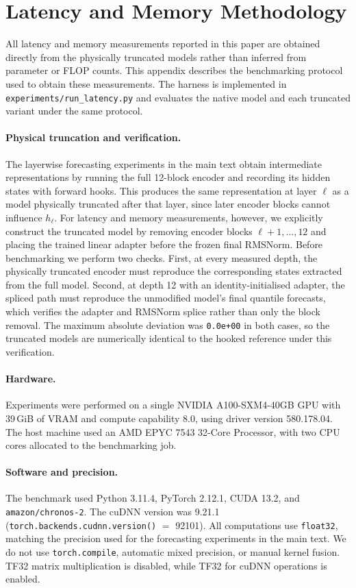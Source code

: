 \section{Latency and Memory Methodology}
\label{app:latency-methodology}

All latency and memory measurements reported in this paper are obtained directly from the physically truncated models rather than inferred from parameter or FLOP counts. This appendix describes the benchmarking protocol used to obtain these measurements. The harness is implemented in \texttt{experiments/run\_latency.py} and evaluates the native model and each truncated variant under the same protocol.

\paragraph{Physical truncation and verification.}
The layerwise forecasting experiments in the main text obtain intermediate representations by running the full 12-block encoder and recording its hidden states with forward hooks. This produces the same representation at layer \(\ell\) as a model physically truncated after that layer, since later encoder blocks cannot influence \(h_\ell\). For latency and memory measurements, however, we explicitly construct the truncated model by removing encoder blocks \(\ell+1,\ldots,12\) and placing the trained linear adapter before the frozen final RMSNorm. Before benchmarking we perform two checks. First, at every measured depth, the physically truncated encoder must reproduce the corresponding states extracted from the full model. Second, at depth 12 with an identity-initialised adapter, the spliced path must reproduce the unmodified model's final quantile forecasts, which verifies the adapter and RMSNorm splice rather than only the block removal. The maximum absolute deviation was \texttt{0.0e+00} in both cases, so the truncated models are numerically identical to the hooked reference under this verification.

\paragraph{Hardware.}
Experiments were performed on a single NVIDIA A100-SXM4-40GB GPU with 39\,GiB of VRAM and compute capability 8.0, using driver version 580.178.04. The host machine used an AMD EPYC 7543 32-Core Processor, with two CPU cores allocated to the benchmarking job.

\paragraph{Software and precision.}
The benchmark used Python 3.11.4, PyTorch 2.12.1, CUDA 13.2, and \texttt{amazon/chronos-2}. The cuDNN version was 9.21.1 (\texttt{torch.backends.cudnn.version()} \(=\) 92101). All computations use \texttt{float32}, matching the precision used for the forecasting experiments in the main text. We do not use \texttt{torch.compile}, automatic mixed precision, or manual kernel fusion. TF32 matrix multiplication is disabled, while TF32 for cuDNN operations is enabled.

